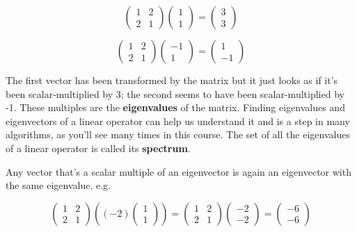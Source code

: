 \documentclass[oneside,english]{amsbook}
\numberwithin{section}{chapter}
\theoremstyle{plain}
\theoremstyle{definition}
\begin{document}
\[\begin{pmatrix}
	1 & 2 \\
	2 & 1
\end{pmatrix}\begin{pmatrix}
	1 \\
	1
\end{pmatrix} = \begin{pmatrix}
	3 \\
	3
\end{pmatrix}\]

\[\begin{pmatrix}
	1 & 2 \\
	2 & 1
\end{pmatrix}\begin{pmatrix}
	- 1 \\
	1
\end{pmatrix} = \begin{pmatrix}
	1 \\
	- 1
\end{pmatrix}\]

The first vector has been transformed by the matrix but it just looks as
if it's been scalar-multiplied by 3; the second seems to have been
scalar-multiplied by -1. These multiples are the \textbf{eigenvalues} of
the matrix. Finding eigenvalues and eigenvectors of a linear operator
can help us understand it and is a step in many algorithms, as you'll
see many times in this course. The set of all the eigenvalues of a
linear operator is called its \textbf{spectrum}.

Any vector that's a scalar multiple of an eigenvector is again an
eigenvector with the same eigenvalue, e.g.

\[\begin{pmatrix}
	1 & 2 \\
	2 & 1
\end{pmatrix}\left( ( - 2)\begin{pmatrix}
	1 \\
	1
\end{pmatrix} \right) = \begin{pmatrix}
	1 & 2 \\
	2 & 1
\end{pmatrix}\begin{pmatrix}
	- 2 \\
	- 2
\end{pmatrix} = \begin{pmatrix}
	- 6 \\
	- 6
\end{pmatrix}\]
\end{document}
